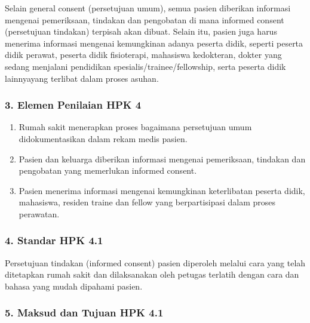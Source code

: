 \documentclass[
]{book}
\providecommand{\tightlist}{%
  \setlength{\itemsep}{0pt}\setlength{\parskip}{0pt}}
\begin{document}
Selain general consent (persetujuan umum), semua pasien diberikan informasi mengenai pemeriksaan, tindakan dan pengobatan di mana informed consent (persetujuan tindakan) terpisah akan dibuat. Selain itu, pasien juga harus menerima informasi mengenai kemungkinan adanya peserta didik, seperti peserta didik perawat, peserta didik fisioterapi, mahasiswa kedokteran, dokter yang sedang menjalani pendidikan spesialis/trainee/fellowship, serta peserta didik lainnyayang terlibat dalam proses asuhan.

\hypertarget{elemen-penilaian-hpk-4}{%
\subsubsection*{3. Elemen Penilaian HPK 4}\label{elemen-penilaian-hpk-4}}

\begin{enumerate}
\def\labelenumi{\alph{enumi}.}
\tightlist
\item
  Rumah sakit menerapkan proses bagaimana persetujuan umum didokumentasikan dalam rekam medis pasien.
\item
  Pasien dan keluarga diberikan informasi mengenai pemeriksaan, tindakan dan pengobatan yang memerlukan informed consent.
\item
  Pasien menerima informasi mengenai kemungkinan keterlibatan peserta didik, mahasiswa, residen traine dan fellow yang berpartisipasi dalam proses perawatan.
\end{enumerate}

\hypertarget{standar-hpk-4.1}{%
\subsubsection*{4. Standar HPK 4.1}\label{standar-hpk-4.1}}

Persetujuan tindakan (informed consent) pasien diperoleh melalui cara yang telah ditetapkan rumah sakit dan dilaksanakan oleh petugas terlatih dengan cara dan bahasa yang mudah dipahami pasien.

\hypertarget{maksud-dan-tujuan-hpk-4.1}{%
\subsubsection*{5. Maksud dan Tujuan HPK 4.1}\label{maksud-dan-tujuan-hpk-4.1}}
\end{document}
